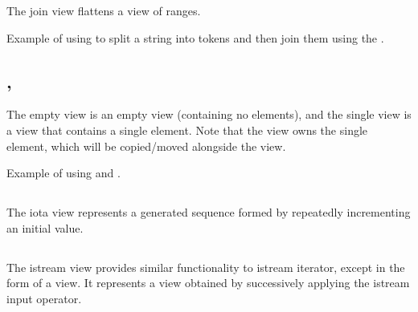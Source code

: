 The join view flattens a view of ranges.

\begin{box-note}
\footnotesize Example of using  to split a string into tokens and then join them using the .
\tcblower
{}
\end{box-note}

\subsection{\texorpdfstring{, }{\texttt{std::views::empty}, \texttt{std::views::single}}}

The empty view is an empty view (containing no elements), and the single view is a view that contains a single element.
Note that the view owns the single element, which will be copied/moved alongside the view.

\begin{box-note}
\footnotesize Example of using  and .
\tcblower
{}
\end{box-note}

\subsection{\texorpdfstring{}{\texttt{std::views::iota}}}

The iota view represents a generated sequence formed by repeatedly incrementing an initial value.

\subsection{\texorpdfstring{}{\texttt{std::views::istream}}}

The istream view provides similar functionality to istream iterator, except in the form of a view.
It represents a view obtained by successively applying the istream input operator.